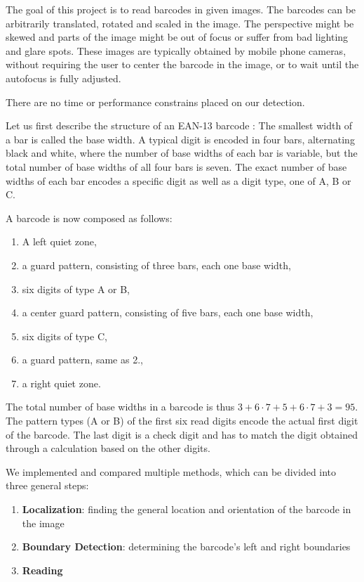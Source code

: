 The goal of this project is to read barcodes in given images. The barcodes can
be arbitrarily translated, rotated and scaled in the image. The perspective
might be skewed and parts of the image might be out of focus or suffer from bad
lighting and glare spots. These images are typically obtained by mobile phone
cameras, without requiring the user to center the barcode in the image, or to
wait until the autofocus is fully adjusted.

There are no time or performance constrains placed on our detection.

Let us first describe the structure of an EAN-13 barcode \cite{GS12017}:
The smallest width of a bar is called the base width. A typical digit is encoded
in four bars, alternating black and white, where the number of base widths
of each bar is variable, but the total number of base widths of all four bars is seven.
The exact number of base widths of each bar encodes a specific digit as well as a digit
type, one of A, B or C.

A barcode is now composed as follows:
\begin{enumerate}
\item A left quiet zone,
\item a guard pattern, consisting of three bars, each one base width,
\item six digits of type A or B,
\item a center guard pattern, consisting of five bars, each one base width,
\item six digits of type C,
\item a guard pattern, same as 2.,
\item a right quiet zone.
\end{enumerate}

The total number of base widths in a barcode is thus $3 + 6\cdot 7 + 5 + 6\cdot 7 + 3=95$.
The pattern types (A or B) of the first six read digits encode the actual first
digit of the barcode. The last digit is a check digit and has to match the digit
obtained through a calculation based on the other digits.

We implemented and compared multiple methods, which can be divided into
three general steps:
\begin{enumerate}
\item \textbf{Localization}: finding the general location and orientation of the barcode
  in the image
\item \textbf{Boundary Detection}: determining the barcode's left and right boundaries
\item \textbf{Reading}
\end{enumerate}


